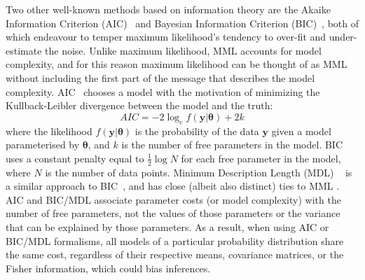 \documentclass{elsarticle}
\newcommand{\vect}[1]{\boldsymbol{\mathbf{#1}}}
\renewcommand{\vec}[1]{\vect{#1}}
\def\datum{y}
\def\data{\vect{\datum}}
\begin{document}

Two other well-known methods based on information theory are the Akaike 
Information Criterion (AIC)~\cite{akaike1974} and Bayesian Information Criterion
(BIC)~\cite{schwarz1978estimating}, both of which endeavour to temper maximum 
likelihood's tendency to over-fit and under-estimate the noise. Unlike maximum
likelihood, MML accounts for model complexity, and for this reason maximum
likelihood can be thought of as MML without including the first part of the
message that describes the model complexity. AIC~\cite{akaike1974} chooses a 
model with the motivation of minimizing the Kullback-Leibler divergence 
between the model and the truth:
\begin{equation}
    AIC = -2 \log_{e}f(\vec{\data} | \vec{\theta}) + 2 k
\end{equation}
\noindent{}where the likelihood $f(\vec{\data} | \vec{\theta})$ is the probability 
of the data $\vec{\data}$ given a model parameterised by $\vec{\theta}$, and $k$ 
is the number of free parameters in the model. BIC~\cite{schwarz1978estimating} 
uses a constant penalty equal to $\frac{1}{2}\log{N}$ for each free parameter in the 
model, where $N$ is the number of data points. Minimum Description Length (MDL)
~\cite{rissanen1978modeling} is a similar approach to BIC~\cite{schwarz1978estimating},
and has close (albeit also distinct) ties to MML \cite{WallaceBoulton1968}.
AIC and BIC/MDL associate parameter costs (or model complexity) with the number 
of free parameters, not the values of those parameters or the variance that
can be explained by those parameters. As a result, when using AIC or BIC/MDL
formalisms, all models of a particular probability distribution share the same
cost, regardless of their respective means, covariance matrices, or the
Fisher information, which could bias inferences.


\end{document}
